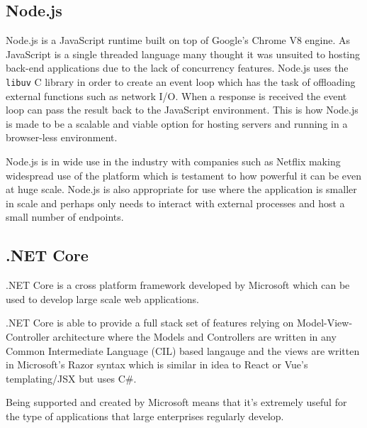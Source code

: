\subsection{Node.js}
Node.js \cite{nodejs} is a JavaScript runtime built on top of Google's Chrome V8 engine. As JavaScript is a single threaded language many thought it was unsuited to hosting back-end applications due to the lack of concurrency features. Node.js uses the \texttt{libuv} C library \cite{libuv} in order to create an event loop which has the task of offloading external functions such as network I/O. When a response is received the event loop can pass the result back to the JavaScript environment. This is how Node.js is made to be a scalable and viable option for hosting servers and running in a browser-less environment.

Node.js is in wide use in the industry with companies such as Netflix \cite{netflix-nodejs} making widespread use of the platform which is testament to how powerful it can be even at huge scale. Node.js is also appropriate for use where the application is smaller in scale and perhaps only needs to interact with external processes and host a small number of endpoints.

\subsection{.NET Core}

.NET Core \cite{.netcore} is a cross platform framework developed by Microsoft which can be used to develop large scale web applications. 

.NET Core is able to provide a full stack set of features relying on Model-View-Controller architecture where the Models and Controllers are written in any Common Intermediate Language (CIL) based langauge and the views are written in Microsoft's Razor syntax which is similar in idea to React or Vue's templating/JSX but uses C\#.

Being supported and created by Microsoft means that it's extremely useful for the type of applications that large enterprises regularly develop.

\pagebreak
